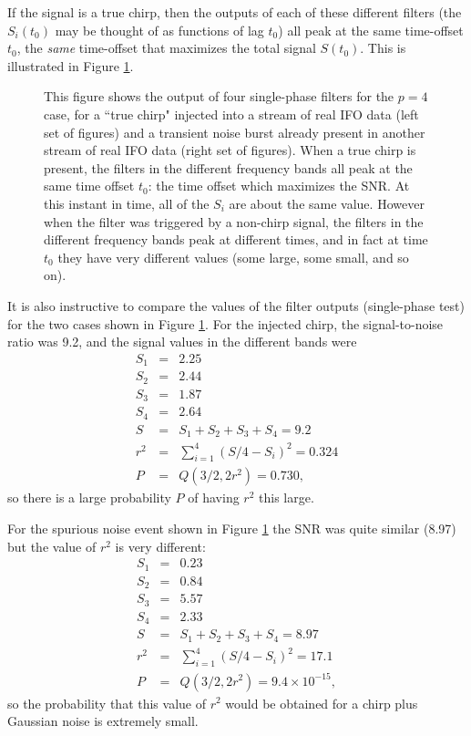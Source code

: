 If the signal is a true chirp, then the outputs of each of these different
filters (the $S_i(t_0)$ may be thought of as functions of lag $t_0$)
all peak at the same time-offset $t_0$, the {\it same} time-offset that
maximizes the total signal $S(t_0)$.  This is illustrated in Figure \ref{f:timefreqplot}.
\begin{figure}[h]
\begin{center}
\caption{
\label{f:timefreqplot}
This figure shows the output of four single-phase filters for the $p=4$
case, for a ``true chirp" injected into a stream of real IFO data
(left set of figures) and a transient noise burst already present in
another stream of real IFO data (right set of figures). When a true
chirp is present, the filters in the different frequency bands all peak
at the same time offset $t_0$: the time offset which maximizes the SNR.
At this instant in time, all of the $S_i$ are about the same value.
However when the filter was triggered by a non-chirp signal, the filters
in the different frequency bands peak at different times, and in fact
at time $t_0$ they have very different values (some large, some small,
and so on).
}
\end{center}
\end{figure}
It is also instructive to compare the values of the filter
outputs (single-phase test) for the two cases shown in Figure
\ref{f:timefreqplot}.  For the injected chirp, the signal-to-noise ratio
was 9.2, and the signal values in the different bands were
\begin{eqnarray}
\nonumber
S_1 & = & 2.25\\
\nonumber
S_2 & = & 2.44\\
\nonumber
S_3 & = & 1.87\\
\nonumber
S_4 & = & 2.64\\
S & = & S_1 + S_2 + S_3 + S_4 = 9.2 \\
\nonumber
r^2 & = & \sum_{i=1}^4 (S/4 - S_i)^2 = 0.324\\
\nonumber
P & = & Q(3/2, 2 r^2) = 0.730,
\end{eqnarray}
so there is a large probability $P$ of having $r^2$ this large.

For the spurious noise event shown in Figure \ref{f:timefreqplot} the
SNR was quite similar (8.97) but the value of $r^2$ is very different:
\begin{eqnarray}
\nonumber
S_1 & = & 0.23\\
\nonumber
S_2 & = & 0.84\\
\nonumber
S_3 & = & 5.57\\
\nonumber
S_4 & = & 2.33\\
S & = & S_1 + S_2 + S_3 + S_4 = 8.97\\
\nonumber
r^2 & = & \sum_{i=1}^4 (S/4 - S_i)^2 = 17.1\\
\nonumber
P & = & Q(3/2, 2 r^2) =9.4 \times 10^{-15},
\end{eqnarray}
so the probability that this value of $r^2$ would be obtained for a chirp
plus Gaussian noise is extremely small.
\clearpage


